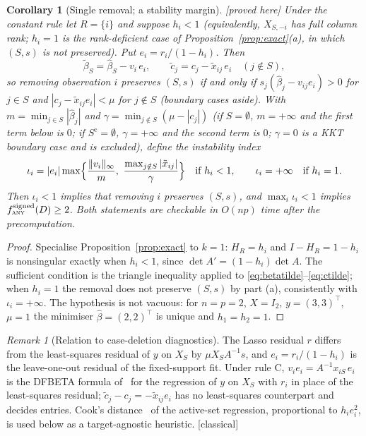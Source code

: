 \documentclass[10pt,a4paper]{article}
\theoremstyle{plain}
\newtheorem{corollary}[theorem]{Corollary}
\theoremstyle{definition}
\theoremstyle{remark}
\newtheorem{remark}[theorem]{Remark}
\newcommand{\Sc}{S^{\mathrm{c}}}
\newcommand{\status}[1]{\textnormal{\textsf{\small [#1]}}}
\newcommand{\tsc}[1]{\textnormal{\textsc{#1}}}  %
\begin{document}
\begin{corollary}[Single removal; a stability margin]\label{cor:single}\status{proved here}
Under the constant rule let $R=\{i\}$ and suppose $h_i<1$ (equivalently, $X_{S,-i}$ has full column rank; $h_i=1$ is the rank-deficient case of Proposition~\ref{prop:exact}(a), in which $(S,s)$ is not preserved). Put $e_i=r_i/(1-h_i)$. Then
\[
\tilde\beta_S=\hat\beta_S-v_i\,e_i,\qquad \tilde c_j=c_j-\tilde x_{ij}\,e_i\quad(j\notin S),
\]
so removing observation $i$ preserves $(S,s)$ if and only if $s_j(\hat\beta_j-v_{ij}e_i)>0$ for $j\in S$ and $|c_j-\tilde x_{ij}e_i|<\mu$ for $j\notin S$ (boundary cases aside). With $m=\min_{j\in S}|\hat\beta_j|$ and $\gamma=\min_{j\notin S}(\mu-|c_j|)$ (if $S=\emptyset$, $m=+\infty$ and the first term below is $0$; if $\Sc=\emptyset$, $\gamma=+\infty$ and the second term is $0$; $\gamma=0$ is a KKT boundary case and is excluded), define the \emph{instability index}
\[
\iota_i=|e_i|\max\Bigl\{\frac{\lVert v_i\rVert_\infty}{m},\ \frac{\max_{j\notin S}|\tilde x_{ij}|}{\gamma}\Bigr\}\quad\text{if }h_i<1,\qquad \iota_i=+\infty\quad\text{if }h_i=1 .
\]
Then $\iota_i<1$ implies that removing $i$ preserves $(S,s)$, and $\max_i\iota_i<1$ implies $f^{\mathrm{signed}}_{\tsc{any}}(D)\ge2$. Both statements are checkable in $O(np)$ time after the precomputation.
\end{corollary}
\begin{proof}
Specialise Proposition~\ref{prop:exact} to $k=1$: $H_R=h_i$ and $I-H_R=1-h_i$ is nonsingular exactly when $h_i<1$, since $\det A'=(1-h_i)\det A$. The sufficient condition is the triangle inequality applied to \eqref{eq:betatilde}--\eqref{eq:ctilde}; when $h_i=1$ the removal does not preserve $(S,s)$ by part (a), consistently with $\iota_i=+\infty$. The hypothesis is not vacuous: for $n=p=2$, $X=I_2$, $y=(3,3)^{\top}$, $\mu=1$ the minimiser $\hat\beta=(2,2)^{\top}$ is unique and $h_1=h_2=1$.
\end{proof}

\begin{remark}[Relation to case-deletion diagnostics]\label{rem:cook}
The Lasso residual $r$ differs from the least-squares residual of $y$ on $X_S$ by $\mu X_SA^{-1}s$, and $e_i=r_i/(1-h_i)$ is the leave-one-out residual of the fixed-support fit. Under rule C, $v_ie_i=A^{-1}x_{iS}\,e_i$ is the DFBETA formula of~\citet{belsley1980} for the regression of $y$ on $X_S$ with $r_i$ in place of the least-squares residual; $\tilde c_j-c_j=-\tilde x_{ij}e_i$ has no least-squares counterpart and decides entries. Cook's distance~\citep{cook1977} of the active-set regression, proportional to $h_ie_i^2$, is used below as a target-agnostic heuristic. \status{classical}
\end{remark}
\end{document}

